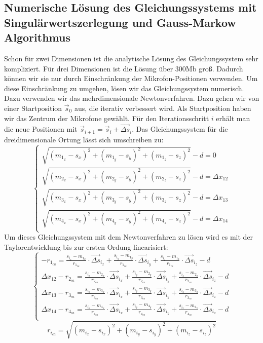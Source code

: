 \subsection{Numerische Lösung des Gleichungssystems mit Singulärwertszerlegung und Gauss-Markow Algorithmus}
Schon für zwei Dimensionen ist die analytische Lösung des Gleichungssystem sehr kompliziert. Für drei Dimensionen ist die Lösung über 300Mb groß. Dadurch können wir sie nur durch Einschränkung der Mikrofon-Positionen verwenden. Um diese Einschränkung zu umgehen, lösen wir das Gleichungssystem numerisch. Dazu verwenden wir das mehrdimensionale Newtonverfahren. Dazu gehen wir von einer Startposition $\vec{s}_0$ aus, die iterativ verbessert wird. Als Startposition haben wir das Zentrum der Mikrofone gewählt. Für den Iterationsschritt $i$ erhält man die neue Positionen mit $\vec{s}_{i + 1} = \vec{s}_i + \vec{\Delta{s}}_i$. Das Gleichungssystem für die dreidimensionale Ortung lässt sich umschreiben zu:
$$\begin{cases}
\sqrt{(m_{1_x} - s_x)^2 + (m_{1_y} - s_y)^2 + (m_{1_z} - s_z)^2} - d = 0 \\
\sqrt{(m_{2_x} - s_x)^2 + (m_{2_y} - s_y)^2 + (m_{2_z} - s_z)^2} - d = \Delta{x_{12}} \\
\sqrt{(m_{3_x} - s_x)^2 + (m_{3_y} - s_y)^2 + (m_{3_z} - s_z)^2} - d = \Delta{x_{13}} \\
\sqrt{(m_{4_x} - s_x)^2 + (m_{4_y} - s_y)^2 + (m_{4_z} - s_z)^2} - d = \Delta{x_{14}} \\
\end{cases}$$
Um dieses Gleichungssystem mit dem Newtonverfahren zu lösen wird es mit der Taylorentwicklung bis zur ersten Ordung linearisiert:
$$\begin{cases}
-r_{1_{ca}} = \frac{s_{i_x} - m_{1_x}}{r_{1_{ca}}} \cdot \vec{\Delta{s}}_{i_x} + \frac{s_{i_y} - m_{1_y}}{r_{1_{ca}}} \cdot \vec{\Delta{s}}_{i_y} + \frac{s_{i_z} - m_{1_z}}{r_{1_{ca}}} \cdot \vec{\Delta{s}}_{i_z} - d \\
\Delta{x_{12}} - r_{2_{ca}} = \frac{s_{i_x} - m_{2_x}}{r_{2_{ca}}} \cdot \vec{\Delta{s}}_{i_x} + \frac{s_{i_y} - m_{2_y}}{r_{2_{ca}}} \cdot \vec{\Delta{s}}_{i_y} + \frac{s_{i_z} - m_{2_z}}{r_{2_{ca}}} \cdot \vec{\Delta{s}}_{i_z} - d \\
\Delta{x_{13}} - r_{3_{ca}} = \frac{s_{i_x} - m_{3_x}}{r_{3_{ca}}} \cdot \vec{\Delta{s}}_{i_x} + \frac{s_{i_y} - m_{3_y}}{r_{3_{ca}}} \cdot \vec{\Delta{s}}_{i_y} + \frac{s_{i_z} - m_{3_z}}{r_{3_{ca}}} \cdot \vec{\Delta{s}}_{i_z} - d \\
\Delta{x_{14}} - r_{4_{ca}} = \frac{s_{i_x} - m_{4_x}}{r_{4_{ca}}} \cdot \vec{\Delta{s}}_{i_x} + \frac{s_{i_y} - m_{4_y}}{r_{4_{ca}}} \cdot \vec{\Delta{s}}_{i_y} + \frac{s_{i_z} - m_{4_z}}{r_{4_{ca}}} \cdot \vec{\Delta{s}}_{i_z} - d \\
\end{cases}$$
$$r_{i_{ca}} = \sqrt{(m_{i_x} - s_{i_x})^2 + (m_{i_y} - s_{i_y})^2 + (m_{i_z} - s_{i_z})^2}$$

